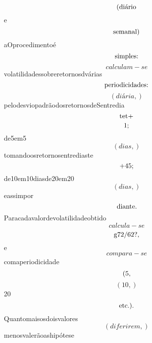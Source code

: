 \documentclass{article}
\begin{document}
\begin{equation}
$(diário$
\end{equation}e\begin{equation}
$semanal)$
\end{equation}aOprocedimentoé\begin{equation}
$simples:$
\end{equation}\begin{equation}
calculam - se
\end{equation}volatilidadessobreretornosdvárias\begin{equation}
$periodicidades:$
\end{equation}\begin{equation}
\left( diária,\right)
\end{equation}pelodesviopadrãodosretornosdeSentredia\begin{equation}
$tet+$
\end{equation}\begin{equation}
$1;$
\end{equation}de5em5\begin{equation}
\left( dias,\right)
\end{equation}tomandoosretornosentrediaste\begin{equation}
$+45;$
\end{equation}de10em10diasde20em20\begin{equation}
\left( dias,\right)
\end{equation}eassimpor\begin{equation}
$diante.$
\end{equation}Paracadavalordevolatilidadeobtido\begin{equation}
calcula - se
\end{equation}\begin{equation}
$g72/62?,$
\end{equation}e\begin{equation}
compara - se
\end{equation}comaperiodicidade\begin{equation}
$(5,$
\end{equation}\begin{equation}
\left( 10,\right)
\end{equation}20\begin{equation}
$etc.).$
\end{equation}Quantomaisosdoisvalores\begin{equation}
\left( diferirem,\right)
\end{equation}menosvalerãoashipótese\begin{equation}

\end{equation}
\end{document}
